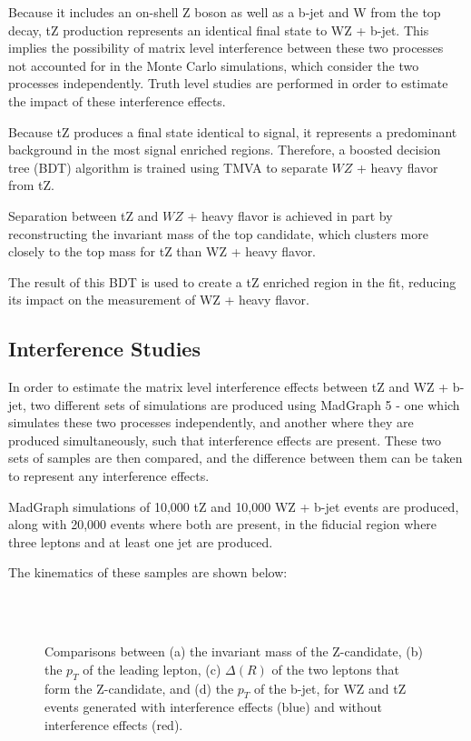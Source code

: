 
Because it includes an on-shell Z boson as well as a b-jet and W from the top decay, tZ production represents an identical final state  to WZ + b-jet. This implies the possibility of matrix level interference between these two processes not accounted for in the Monte Carlo simulations, which consider the two processes independently. Truth level studies are performed in order to estimate the impact of these interference effects.

Because tZ produces a final state identical to signal, it represents a predominant background in the most signal enriched regions. Therefore, a boosted decision tree (BDT) algorithm is trained using TMVA \cite{TMVA_guide} to separate $WZ$ + heavy flavor from tZ.

Separation between tZ and $WZ$ + heavy flavor is achieved in part by reconstructing the invariant mass of the top candidate, which clusters more closely to the top mass for tZ than WZ + heavy flavor.

The result of this BDT is used to create a tZ enriched region in the fit, reducing its impact on the measurement of WZ + heavy flavor.

\subsection{Interference Studies}
\label{subsec:interference}

In order to estimate the matrix level interference effects between tZ and WZ + b-jet, two different sets of simulations are produced using MadGraph 5 \cite{Madgraph} - one which simulates these two processes independently, and another where they are produced simultaneously, such that interference effects are present. These two sets of samples are then compared, and the difference between them can be taken to represent any interference effects.

MadGraph simulations of 10,000 tZ and 10,000 WZ + b-jet events are produced, along with 20,000 events where both are present, in the fiducial region where three leptons and at least one jet are produced. 

The kinematics of these samples are shown below:

\begin{figure}[H]
    \\                        
    \\
    \caption{Comparisons between (a) the invariant mass of the Z-candidate, (b) the $p_T$ of the leading lepton, (c) $\Delta(R)$ of the two leptons that form the Z-candidate, and (d) the $p_T$ of the b-jet, for WZ and tZ events generated with interference effects (blue) and without interference effects (red).}
\end{figure}

